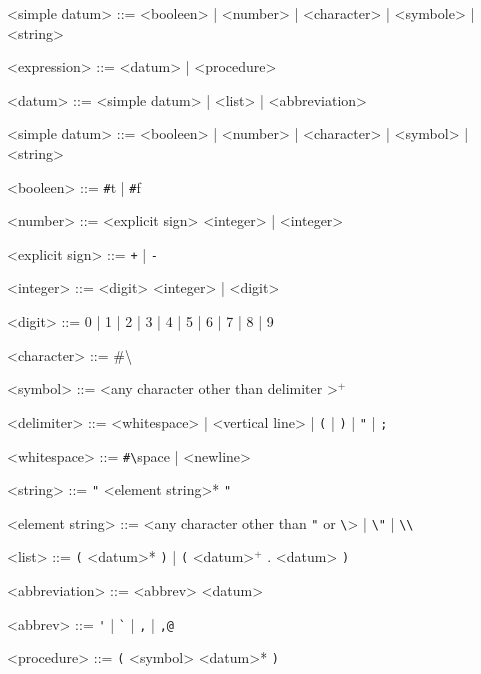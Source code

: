 
\begin{grammarC}{<simple datum> ::= <booleen> | <number> | <character> | <symbole> | <string>}

  <expression> ::= <datum> | <procedure>
  
  <datum> ::= <simple datum> | <list> | <abbreviation>
  
  <simple datum> ::= <booleen> | <number> | <character> | <symbol> | <string>
  
  <booleen> ::= \verb|#|t | \verb|#|f
  
  <number> ::= <explicit sign> <integer> | <integer>
  
  <explicit sign> ::= \verb|+| | \verb|-|
  
  <integer> ::= <digit> <integer> | <digit>
  
  <digit> ::= 0 | 1 | 2 | 3 | 4 | 5 | 6 | 7 | 8 | 9

  <character> ::= \#\textbackslash <any character>

  <symbol> ::= <any character other than \textlangle delimiter \textrangle>$^+$

  <delimiter> ::= <whitespace> | <vertical line> | \verb|(| | \verb|)| | \verb|"| | \verb|;|

  <whitespace> ::=  \verb|#\|space | <newline>
  
  <string> ::= \verb|"| <element string>* \verb|"|
  
  <element string> ::= <any character other than \verb|"| or \verb|\|> | \verb|\"| | \verb|\\|

  <list> ::= \verb|(| <datum>* \verb|)| | \verb|(| <datum>$^+$ . <datum> \verb|)|
  
  <abbreviation> ::= <abbrev> <datum>
  
  <abbrev> ::= \verb|'| | \verb|`| | \verb|,| | \verb|,@|

  <procedure> ::= \verb|(| <symbol> <datum>* \verb|)|	
  
\end{grammarC}

